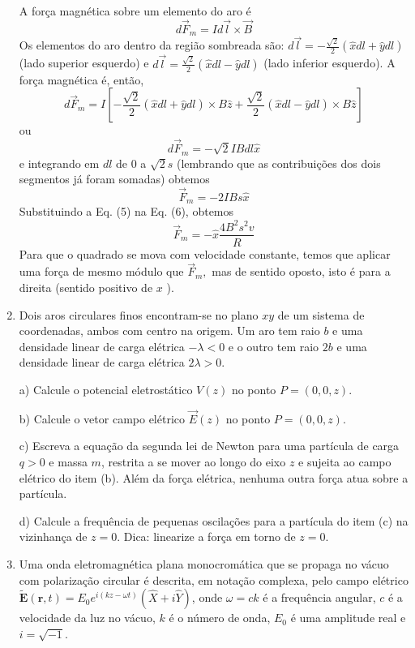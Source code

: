 \begin{enumerate}[start=1,label={\bfseries Q\arabic*.}]
\resposta A força magnética sobre um elemento do aro é
$$
d \vec{F}_{m}=I d \vec{l} \times \vec{B}
$$
Os elementos do aro dentro da região sombreada são: $d \vec{l}=-\frac{\sqrt{2}}{2}(\hat{x} d l+\hat{y} d l)$ (lado superior esquerdo) e $d \vec{l}=\frac{\sqrt{2}}{2}(\hat{x} d l-\hat{y} d l)$ (lado inferior esquerdo). A força magnética é, então,
$$
d \vec{F}_{m}=I\left[-\frac{\sqrt{2}}{2}(\hat{x} d l+\hat{y} d l) \times B \hat{z}+\frac{\sqrt{2}}{2}(\hat{x} d l-\hat{y} d l) \times B \hat{z}\right]
$$
ou
$$
d \vec{F}_{m}=-\sqrt{2} I B d l \hat{x}
$$
e integrando em $d l$ de 0 a $\sqrt{2} s$ (lembrando que as contribuições dos dois segmentos já foram somadas) obtemos
$$
\vec{F}_{m}=-2 I B s \hat{x}
$$
Substituindo a Eq. (5) na Eq. (6), obtemos
$$
\vec{F}_{m}=-\hat{x} \frac{4 B^{2} s^{2} v}{R}
$$
Para que o quadrado se mova com velocidade constante, temos que aplicar uma força de mesmo módulo que $\vec{F}_{m},$ mas de sentido oposto, isto é para a direita (sentido positivo de $x$ ).






\item Dois aros circulares finos encontram-se no plano $xy$ de um sistema de coordenadas, ambos com centro na origem. Um aro tem raio $b$ e uma densidade linear de carga elétrica $-\lambda < 0$ e o outro tem raio $2b$ e uma densidade linear de carga elétrica $2 \lambda > 0$.


a) Calcule o potencial eletrostático $V (z)$ no ponto $P = (0,0,z)$.

\resposta

b) Calcule o vetor campo elétrico $\vec{E}(z)$ no ponto $P = (0,0,z)$.

\resposta

c) Escreva a equação da segunda lei de Newton para uma partícula de carga $q > 0$ e massa $m$, restrita a se mover ao longo do eixo $z$ e sujeita ao campo elétrico do item (b). Além da força elétrica, nenhuma outra força atua sobre a partícula.

\resposta

d) Calcule a frequência de pequenas oscilações para a partícula do item (c) na vizinhança de $z = 0$. Dica: linearize a força em torno de $z = 0$.




\item Uma onda eletromagnética plana monocromática que se propaga no vácuo com polarização circular é descrita, em notação complexa, pelo campo elétrico $\tilde{\mathbf{E}}(\mathbf{r},t) = E_{0}e^{i(kz-\omega t)} \left(\hat{X} + i \hat{Y} \right)$, onde $\omega = ck$ é a frequência angular, $c$ é a velocidade da luz no vácuo, $k$ é o número de onda, $E_{0}$ é uma amplitude real e $i = \sqrt{-1}$.



\end{enumerate}
